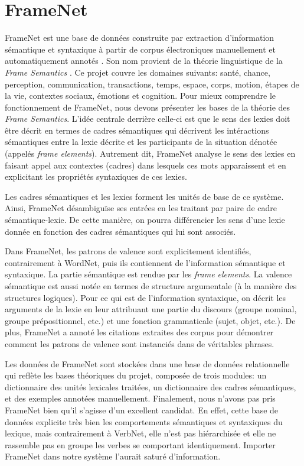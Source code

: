 \section{FrameNet}
FrameNet est une base de données construite par extraction d'information sémantique et syntaxique à partir de corpus électroniques manuellement et automatiquement annotés \citep{FillmoreBackgroundFramenet2003a}. Son nom provient de la théorie linguistique de la \emph{Frame Semantics} \citep{BakerBerkeleyFrameNetProject1998}. Ce projet couvre les domaines suivants: santé, chance, perception, communication, transactions, temps, espace, corps, motion, étapes de la vie, contextes sociaux, émotions et cognition. Pour mieux comprendre le fonctionnement de FrameNet, nous devons présenter les bases de la théorie des \emph{Frame Semantics}. L'idée centrale derrière celle-ci est que le sens des lexies doit être décrit en termes de cadres sémantiques qui décrivent les intéractions sémantiques entre la lexie décrite et les participants de la situation dénotée (appelés \emph{frame elements}). Autrement dit, FrameNet analyse le sens des lexies en faisant appel aux contextes (cadres) dans lesquels ces mots apparaissent et en explicitant les propriétés syntaxiques de ces lexies.

Les cadres sémantiques et les lexies forment les unités de base de ce système. Ainsi, FrameNet désambiguïse ses entrées en les traitant par paire de cadre sémantique-lexie. De cette manière, on pourra différencier les sens d'une lexie donnée en fonction des cadres sémantiques qui lui sont associés.

Dans FrameNet, les patrons de valence sont explicitement identifiés, contrairement à WordNet, puis ils contiennent de l'information sémantique et syntaxique. La partie sémantique est rendue par les \emph{frame elements}. La valence sémantique est aussi notée en termes de structure argumentale (à la manière des structures logiques). Pour ce qui est de l'information syntaxique, on décrit les arguments de la lexie en leur attribuant une partie du discours (groupe nominal, groupe prépositionnel, etc.) et une fonction grammaticale (sujet, objet, etc.). De plus, FrameNet a annoté les citations extraites des corpus pour démontrer comment les patrons de valence sont instanciés dans de véritables phrases.

Les données de FrameNet sont stockées dans une base de données relationnelle qui reflète les bases théoriques du projet, composée de trois modules: un dictionnaire des unités lexicales traitées, un dictionnaire des cadres sémantiques, et des exemples annotées manuellement. Finalement, nous n'avons pas pris FrameNet bien qu'il s'agisse d'un excellent candidat. En effet, cette base de données explicite très bien les comportements sémantiques et syntaxiques du lexique, mais contrairement à VerbNet, elle n'est pas hiérarchisée et elle ne rassemble pas en groupe les verbes se comportant identiquement. Importer FrameNet dans notre système l'aurait saturé d'information.

